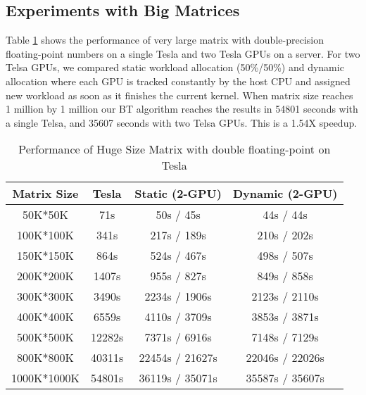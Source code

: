 \subsection{Experiments with Big Matrices}
\vspace{-0.1in}
Table \ref{tab:hugeResultTesla} shows the performance of very large matrix with double-precision floating-point numbers on a single Tesla and two Tesla GPUs on a server. For two Telsa GPUs, we compared static workload allocation (50\%/50\%) and dynamic allocation where each GPU is tracked constantly by the host CPU and assigned new workload as soon as it finishes the current kernel. 
When matrix size reaches 1 million by 1 million our BT algorithm reaches the results in 54801 seconds with a single Telsa, and 35607 seconds with two Telsa GPUs. This is a 1.54X speedup.
\begin{table}[h]
\vspace{-0.3in}
\caption{Performance of Huge Size Matrix with double floating-point on Tesla}
\vspace{-0.1in}
\centering
\begin{tabular}{|c|c|c|c|}
\hline
Matrix Size &  Tesla  & Static (2-GPU) & Dynamic (2-GPU) \\ \hline
 50K*50K    &    71s  &   50s /  45s &  44s / 44s \\ \hline
 100K*100K  &   341s  &  217s / 189s &  210s / 202s \\ \hline
 150K*150K  &   864s  &  524s / 467s &  498s / 507s \\ \hline
 200K*200K  &  1407s  &  955s / 827s &  849s / 858s \\ \hline
 300K*300K  &  3490s  & 2234s / 1906s & 2123s / 2110s\\ \hline
 400K*400K  &  6559s  & 4110s / 3709s & 3853s / 3871s\\ \hline
 500K*500K  & 12282s  & 7371s / 6916s  & 7148s / 7129s\\ \hline
 800K*800K  & 40311s  & 22454s / 21627s &  22046s / 22026s   \\ \hline
 1000K*1000K & 54801s  & 36119s / 35071s   &  35587s / 35607s \\ \hline
\end{tabular}
\label{tab:hugeResultTesla}
\vspace{-0.3in}
\end{table}

